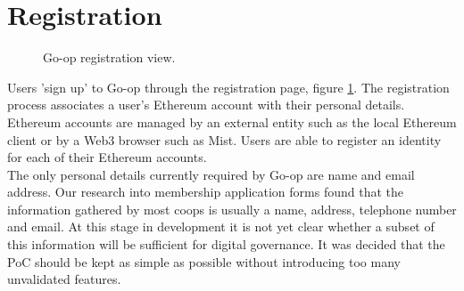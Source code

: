 \section{Registration}
\begin{figure}
\centering
{}
\decoRule
\caption[Go-op Registration View]{Go-op registration view.}
\label{fig:regpage}
\end{figure}

Users 'sign up' to Go-op through the registration page, figure \ref{fig:regpage}. The registration process associates a user's Ethereum account with their personal details. Ethereum accounts are managed by an external entity such as the local Ethereum client or by a Web3 browser such as Mist. Users are able to register an identity for each of their Ethereum accounts.\\

The only personal details currently required by Go-op are name and email address. Our research into membership application forms found that the information gathered by most coops is usually a name, address, telephone number and email. At this stage in development it is not yet clear whether a subset of this information will be sufficient for digital governance. It was decided that the PoC should be kept as simple as possible without introducing too many unvalidated features. 


